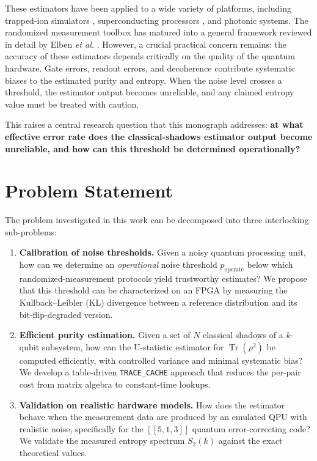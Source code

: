 \documentclass[12pt,a4paper,oneside]{book}
\theoremstyle{plain}
\theoremstyle{definition}
\theoremstyle{remark}
\begin{document}
These estimators have been applied to a wide variety of platforms, including trapped-ion simulators \cite{brydges2019probing}, superconducting processors \cite{elben2021many}, and photonic systems. The randomized measurement toolbox has matured into a general framework reviewed in detail by Elben \textit{et al.} \cite{elben2023toolbox}. However, a crucial practical concern remains: the accuracy of these estimators depends critically on the quality of the quantum hardware. Gate errors, readout errors, and decoherence contribute systematic biases to the estimated purity and entropy. When the noise level crosses a threshold, the estimator output becomes unreliable, and any claimed entropy value must be treated with caution.

This raises a central research question that this monograph addresses: \textbf{at what effective error rate does the classical-shadows estimator output become unreliable, and how can this threshold be determined operationally?}

\section{Problem Statement}
\label{sec:problem}

The problem investigated in this work can be decomposed into three interlocking sub-problems:

\begin{enumerate}[label=\textbf{P\arabic*:}, itemsep=3pt]
    \item \textbf{Calibration of noise thresholds.} Given a noisy quantum processing unit, how can we determine an \emph{operational} noise threshold $p_{\text{operate}}$ below which randomized-measurement protocols yield trustworthy estimates? We propose that this threshold can be characterized on an FPGA by measuring the Kullback--Leibler (KL) divergence between a reference distribution and its bit-flip-degraded version.
    \item \textbf{Efficient purity estimation.} Given a set of $N$ classical shadows of a $k$-qubit subsystem, how can the U-statistic estimator for $\operatorname{Tr}(\rho^2)$ be computed efficiently, with controlled variance and minimal systematic bias? We develop a table-driven \texttt{TRACE\_CACHE} approach that reduces the per-pair cost from matrix algebra to constant-time lookups.
    \item \textbf{Validation on realistic hardware models.} How does the estimator behave when the measurement data are produced by an emulated QPU with realistic noise, specifically for the $[[5,1,3]]$ quantum error-correcting code? We validate the measured entropy spectrum $S_2(k)$ against the exact theoretical values.
\end{enumerate}
\end{document}
